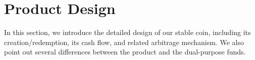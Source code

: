 \documentclass[final,pdftex]{ectaart}
\theoremstyle{plain}
\begin{document}







\section{Product Design}\label{sec:Product-Design}
In this section, we introduce the detailed design of our stable coin, including its creation/redemption, its cash flow, and related arbitrage mechanism. We also point out several differences between the product and the dual-purpose funds.
\end{document}
